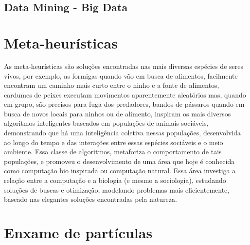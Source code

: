\documentclass[conference,compsoc]{IEEEtran}
\begin{document}
\subsection{Data Mining - Big Data}\label{arte:palavraChave:DataMiningBigData}




\section{Meta-heurísticas}


As meta-heurísticas são soluções encontradas nas mais diversas espécies de seres vivos, por exemplo, as formigas quando 
vão em busca de alimentos, facilmente encontram um caminho mais curto entre o ninho e a fonte de alimentos, cardumes de peixes 
executam movimentos aparentemente aleatórios mas, quando em grupo, são precisos para fuga dos predadores, bandos de pássaros 
quando em busca de novos locais para ninhos ou de alimento, inspiram os mais diversos algoritmos inteligentes baseados em 
populações de animais sociáveis, demonstrando que há uma inteligência coletiva nessas populações, desenvolvida ao longo do 
tempo e das interações entre essas espécies sociáveis e o meio ambiente. Essa classe de algoritmos, metaforiza o comportamento 
de tais populações, e promoveu o desenvolvimento de uma área que hoje é conhecida como computação bio inspirada ou computação 
natural. Essa área investiga a relação entre a computação e a biologia (e mesmo a sociologia), estudando soluções de buscas 
e otimização, modelando problemas mais eficientemente, baseado nas elegantes soluções encontradas pela natureza.


\section{Enxame de partículas}\label{arte:enxames}
\end{document}
